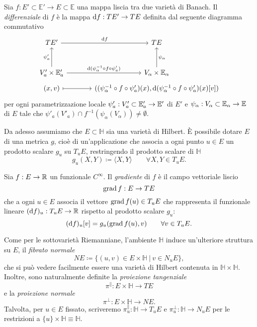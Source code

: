 \begin{defi}
	Sia \(f: E' \subset \mathbb{E}' \to E \subset \mathbb{E}\) una mappa liscia tra due varietà di Banach. Il \textit{differenziale} di \(f\) è la mappa \(\mathrm{d} f: TE' \to TE\) definita dal seguente diagramma commutativo 
	\[
	\begin{tikzcd}[row sep={tiny}, column sep=large]
		TE' \arrow[r,"\dif f"] & TE \\
		\arrow[phantom, "\strut"] & \\
		\arrow[phantom, "\strut"] & \\
		V'_a \times \E'_a \arrow[uuu,"\psi'_a"] \arrow[r,"\dif (\psi_\alpha^{-1} \circ f \circ \psi'_a)"] & V_\alpha \times \E_\alpha \arrow[uuu,"\psi_\alpha"'] \\
		(x,v) \arrow[r, mapsto] & ((\psi_\alpha^{-1} \circ f \circ \psi'_a) (x),\dif (\psi_\alpha^{-1} \circ f \circ \psi'_a) (x) [v])
	\end{tikzcd}
	\]
	per ogni parametrizzazione locale \(\psi'_a:V'_a \subset \mathbb{E}'_a \to \mathbb{E}'\) di \(E'\) e \(\psi_\alpha:V_\alpha \subset \mathbb{E}_\alpha \to \mathbb{E}\) di \(E\) tale che \(\psi'_a(V'_a) \cap f^{-1}(\psi_\alpha(V_\alpha)) \neq \emptyset\).
\end{defi}

Da adesso assumiamo che \(E \subset \mathbb{H}\) sia una varietà di Hilbert. È possibile dotare \(E\) di una metrica \(g\), cioè di un'applicazione che associa a ogni punto \(u \in E\) un prodotto scalare \(g_u\) su \(T_uE\), restringendo il prodotto scalare di \(\mathbb{H}\)
\[
	g_u(X,Y) \coloneq \langle X, Y \rangle \qquad \forall X,Y \in T_uE.
\]

\begin{defi}
	Sia \(f: E \to \mathbb{R}\) un funzionale \(C^\infty\). Il \textit{gradiente} di \(f\) è il campo vettoriale liscio
	\[
		\operatorname{grad} f: E \to TE
	\]
	che a ogni \(u \in E\) associa il vettore \(\operatorname{grad} f(u) \in T_uE\) che rappresenta il funzionale lineare \((\mathrm{d} f)_u:T_uE \to \mathbb{R}\) rispetto al prodotto scalare \(g_u\):
	\[
		(\mathrm{d} f)_u[v] = g_u(\operatorname{grad} f(u), v) \qquad \forall v \in T_uE.
	\]
\end{defi}

Come per le sottovarietà Riemanniane, l'ambiente \(\mathbb{H}\) induce un'ulteriore struttura su \(E\), il \textit{fibrato normale}
\[
	NE \coloneq \{(u,v) \in E \times \mathbb{H} \ | \ v \in N_uE\},
\]
che si può vedere facilmente essere una varietà di Hilbert contenuta in \(\mathbb{H}\times \mathbb{H}\). Inoltre, sono naturalmente definite la \textit{proiezione tangenziale} 
\[\pi^\parallel: E \times \mathbb{H} \to TE\]
e la \textit{proiezione normale} 
\[\pi^\perp: E \times \mathbb{H} \to NE.\]
Talvolta, per \(u \in E\) fissato, scriveremo \(\pi^\parallel_u: \mathbb{H} \to T_uE\) e \(\pi^\perp_u:\mathbb{H} \to N_uE\) per le restrizioni a \(\{u\} \times \mathbb{H} \equiv \mathbb{H}\).

